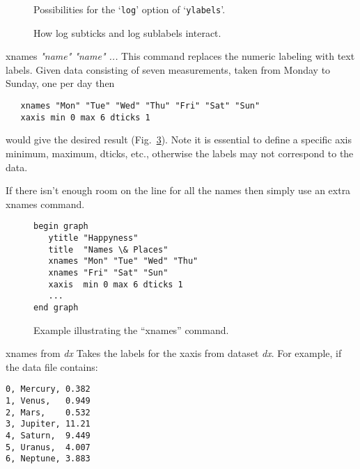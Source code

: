 \begin{commanddescription}
\begin{figure}[tb]
\centering
\mbox{}
\caption{\label{loglab:fig}Possibilities for the `\texttt{log}' option of `\texttt{ylabels}'.}
\end{figure}

\begin{figure}[tb]
\centering
\mbox{}
\caption{\label{logsubt:fig}How log subticks and log sublabels interact.}
\end{figure}

\item[{\sf xnames {\it "name"  "name" ...}}  ]
This command replaces the numeric labeling with text labels. Given data consisting of seven measurements, taken from Monday to Sunday, one per day then

\begin{Verbatim}
   xnames "Mon" "Tue" "Wed" "Thu" "Fri" "Sat" "Sun"
   xaxis min 0 max 6 dticks 1
\end{Verbatim}

would give the desired result (Fig.~\ref{fig:weekday}).  Note it is essential to define a specific axis minimum, maximum, dticks, etc., otherwise the labels may not correspond to the data.

If there isn't enough room on the line for all the names then simply use an extra {\sf xnames} command.

\begin{figure}[tb]
\begin{minipage}[c]{8cm}
\begin{Verbatim}
begin graph
   ytitle "Happyness"
   title  "Names \& Places"
   xnames "Mon" "Tue" "Wed" "Thu"
   xnames "Fri" "Sat" "Sun"
   xaxis  min 0 max 6 dticks 1
   ...
end graph
\end{Verbatim}
\end{minipage}
\hfill
\begin{minipage}[c]{7cm}
\mbox{}
\end{minipage}
\caption{\label{fig:weekday}Example illustrating the ``xnames'' command.}
\end{figure}

\item[{\sf xnames from {\it dx}}]
Takes the labels for the xaxis from dataset {\it dx}. For example, if the data file contains:

\begin{Verbatim}
0, Mercury, 0.382
1, Venus,   0.949
2, Mars,    0.532
3, Jupiter, 11.21
4, Saturn,  9.449
5, Uranus,  4.007
6, Neptune, 3.883
\end{Verbatim}


\end{commanddescription}
